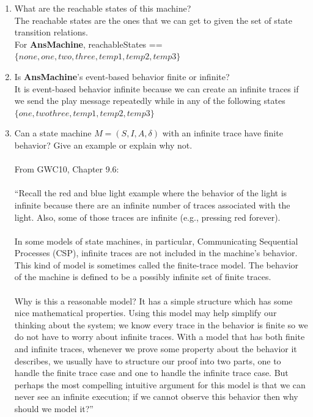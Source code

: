 \documentclass{article}
\begin{document}
\begin{enumerate}
\begin{enumerate}
\begin{enumerate}
   \end{enumerate}
 \item What are the reachable states of this machine? \\
   The reachable states are the ones that we can get to given the set of state transition relations. \\
   For {\bf AnsMachine}, reachableStates == $\{none, one, two, three, temp1, temp2, temp3 \}$ \\
\item Is {\bf AnsMachine}'s event-based behavior finite or
  infinite?\\
  It is event-based behavior infinite because
  we can create an infinite traces if we send
  the play message repeatedly while in any of the following states
  $\{one, two three, temp1, temp2, temp3\}$ \\
 \item Can a state machine $M=(S,I,A,\delta)$ with an infinite trace have finite
   behavior? Give an example or explain why not. \\
   \\
   From GWC10, Chapter 9.6: \\
   \\
   ``Recall the red and blue light example where the behavior of the light is infinite because there are an infinite number of traces associated with the light. Also, some of those traces are infinite (e.g., pressing red forever). \\
   \\
   In some models of state machines, in particular, Communicating Sequential Processes (CSP), infinite traces are not included in the machine’s behavior. This kind of model is sometimes called the finite-trace model. The behavior of the machine is defined to be a possibly infinite set of finite traces.\\
   \\
Why is this a reasonable model? It has a simple structure which has some nice mathematical properties. Using this model may help simplify our thinking about the system; we know every trace in the behavior is finite so we do not have to worry about infinite traces. With a model that has both finite and infinite traces, whenever we prove some property about the behavior it describes, we usually have to structure our proof into two parts, one to handle the finite trace case and one to handle the infinite trace case. But perhaps the most compelling intuitive argument for this model is that we can never see an infinite execution; if we cannot observe this behavior then why should we model it?''


\end{enumerate}
\end{enumerate}
\end{document}
